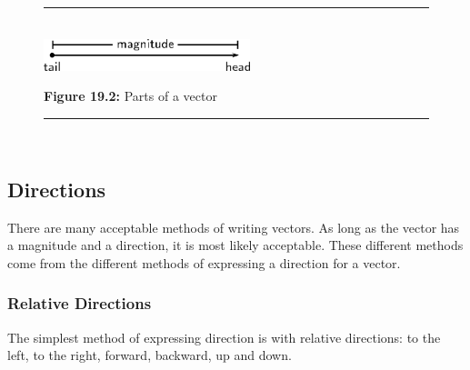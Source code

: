 	\begin{figure}[H] %
    \begin{center}
    \rule[.1in]{\figurerulewidth}{.005in} \\
        \label{m38812*uid4!!!underscore!!!media}\label{m38812*uid4!!!underscore!!!printimage}\includegraphics[width=6cm]{col11305.imgs/m38812_PG11C1_002.png} %
        
      \vspace{2pt}
    \vspace{\rubberspace}\par \begin{cnxcaption}
	  \small \textbf{Figure 19.2: }Parts of a vector
	\end{cnxcaption}
      
    \vspace{.1in}
    \rule[.1in]{\figurerulewidth}{.005in} \\
        
    \end{center}

 \end{figure}   

    \addtocounter{footnote}{-0}
    
      
    
    \label{m38812*cid5}
            \subsection{ Directions}
            \nopagebreak
            
      
      \label{m38812*id187219}There are many acceptable methods of writing vectors. As long as the vector has a magnitude and a direction, it is most likely acceptable. These different methods come from the different methods of expressing a direction for a vector.\par 
      \label{m38812*uid5}
            \subsubsection{ Relative Directions}
            \nopagebreak
            
        
        \label{m38812*id187233}The simplest method of expressing direction is with relative directions: to the left, to the right, forward, backward, up and down.\par 
      
